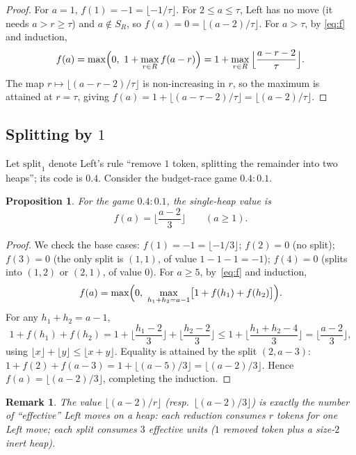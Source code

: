 \documentclass[11pt]{article}
\newtheorem{proposition}[theorem]{Proposition}
\newtheorem{remark}[theorem]{Remark}
\begin{document}
\begin{proof}
For $a=1$, $f(1)=-1=\lfloor-1/\tau\rfloor$. For $2\le a\le\tau$, Left has no move (it needs
$a>r\ge\tau$) and $a\notin S_R$, so $f(a)=0=\lfloor(a-2)/\tau\rfloor$. For $a>\tau$, by
\eqref{eq:f} and induction,
\[
f(a)=\max\Bigl(0,\ 1+\max_{r\in R}f(a-r)\Bigr)
=1+\max_{r\in R}\Big\lfloor\frac{a-r-2}{\tau}\Big\rfloor .
\]
The map $r\mapsto\lfloor(a-r-2)/\tau\rfloor$ is non-increasing in $r$, so the maximum is
attained at $r=\tau$, giving
$f(a)=1+\lfloor(a-\tau-2)/\tau\rfloor=\lfloor(a-2)/\tau\rfloor$.
\end{proof}

\subsection{Splitting by $1$}

Let $\mathrm{split}_1$ denote Left's rule ``remove $1$ token, splitting the remainder into two
heaps''; its code is $0.4$. Consider the budget-race game $0.4:0.1$.

\begin{proposition}\label{prop:split}
For the game $0.4:0.1$, the single-heap value is
\[
f(a)=\Big\lfloor\frac{a-2}{3}\Big\rfloor\qquad(a\ge1).
\]
\end{proposition}

\begin{proof}
We check the base cases: $f(1)=-1=\lfloor-1/3\rfloor$; $f(2)=0$ (no split); $f(3)=0$ (the
only split is $(1,1)$, of value $1-1-1=-1$); $f(4)=0$ (splits into $(1,2)$ or $(2,1)$, of
value $0$). For $a\ge5$, by~\eqref{eq:f} and induction,
\[
f(a)=\max\Bigl(0,\ \max_{h_1+h_2=a-1}\bigl[1+f(h_1)+f(h_2)\bigr]\Bigr).
\]
For any $h_1+h_2=a-1$,
\[
1+f(h_1)+f(h_2)
=1+\Big\lfloor\frac{h_1-2}{3}\Big\rfloor+\Big\lfloor\frac{h_2-2}{3}\Big\rfloor
\le 1+\Big\lfloor\frac{h_1+h_2-4}{3}\Big\rfloor
=\Big\lfloor\frac{a-2}{3}\Big\rfloor,
\]
using $\lfloor x\rfloor+\lfloor y\rfloor\le\lfloor x+y\rfloor$. Equality is attained by the
split $(2,a-3)$: $1+f(2)+f(a-3)=1+\lfloor(a-5)/3\rfloor=\lfloor(a-2)/3\rfloor$. Hence
$f(a)=\lfloor(a-2)/3\rfloor$, completing the induction.
\end{proof}

\begin{remark}
The value $\lfloor(a-2)/r\rfloor$ (resp.\ $\lfloor(a-2)/3\rfloor$) is exactly the number of
``effective'' Left moves on a heap: each reduction consumes $r$ tokens for one Left move;
each split consumes $3$ effective units ($1$ removed token plus a size-$2$ inert heap).
\end{remark}
\end{document}
